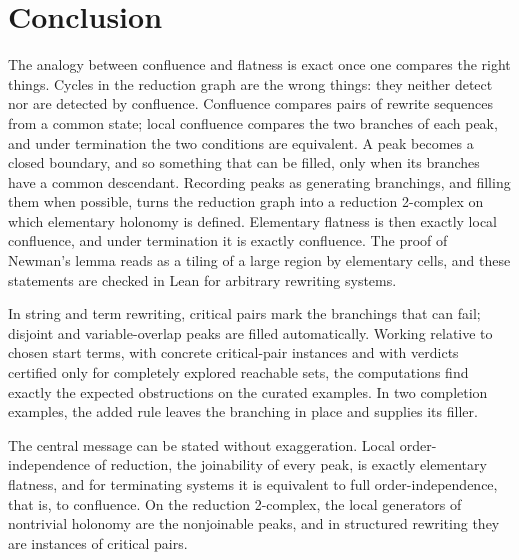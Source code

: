 \section{Conclusion}
\label{sec:conclusion}

The analogy between confluence and flatness is exact once one compares the right things. Cycles in the reduction graph are the wrong things: they neither detect nor are detected by confluence. Confluence compares pairs of rewrite sequences from a common state; local confluence compares the two branches of each peak, and under termination the two conditions are equivalent. A peak becomes a closed boundary, and so something that can be filled, only when its branches have a common descendant. Recording peaks as generating branchings, and filling them when possible, turns the reduction graph into a reduction 2-complex on which elementary holonomy is defined. Elementary flatness is then exactly local confluence, and under termination it is exactly confluence. The proof of Newman's lemma reads as a tiling of a large region by elementary cells, and these statements are checked in Lean for arbitrary rewriting systems.

In string and term rewriting, critical pairs mark the branchings that can fail; disjoint and variable-overlap peaks are filled automatically. Working relative to chosen start terms, with concrete critical-pair instances and with verdicts certified only for completely explored reachable sets, the computations find exactly the expected obstructions on the curated examples. In two completion examples, the added rule leaves the branching in place and supplies its filler.

The central message can be stated without exaggeration. Local order-independence of reduction, the joinability of every peak, is exactly elementary flatness, and for terminating systems it is equivalent to full order-independence, that is, to confluence. On the reduction 2-complex, the local generators of nontrivial holonomy are the nonjoinable peaks, and in structured rewriting they are instances of critical pairs.
